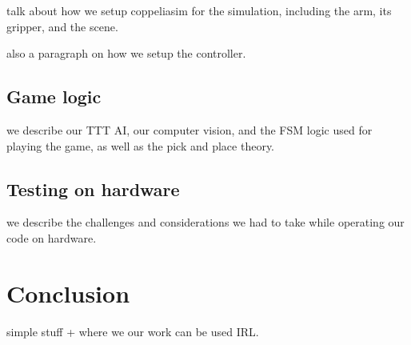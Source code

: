 \documentclass{article}
\begin{document}
talk about how we setup coppeliasim for the simulation, including the arm, its gripper, and the scene.

also a paragraph on how we setup the controller.

\subsection{Game logic}

we describe our TTT AI, our computer vision, and the FSM logic used for playing the game, as well as the pick and place theory.

\subsection{Testing on hardware}

we describe the challenges and considerations we had to take while operating our code on hardware.

\section{Conclusion}

simple stuff + where we our work can be used IRL.

\printbibliography[heading=bibintoc]
\end{document}
